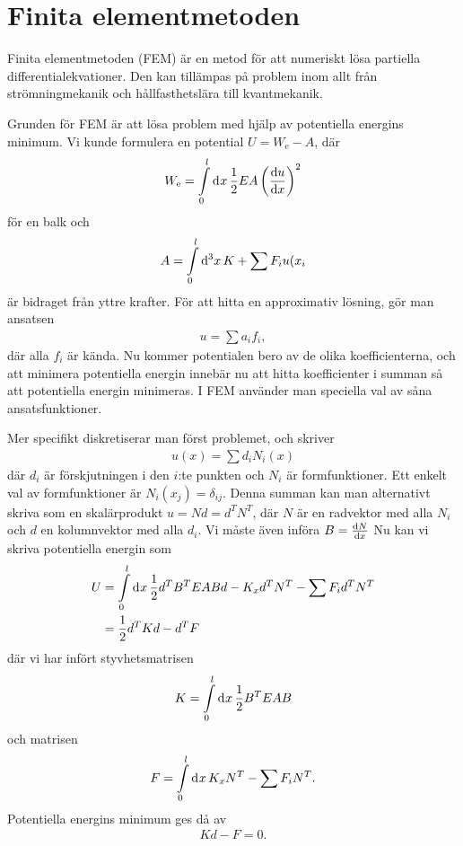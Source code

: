 \section{Finita elementmetoden}

Finita elementmetoden (FEM) är en metod för att numeriskt lösa partiella differentialekvationer. Den kan tillämpas på problem inom allt från strömningmekanik och hållfasthetslära till kvantmekanik.

Grunden för FEM är att lösa problem med hjälp av potentiella energins minimum. Vi kunde formulera en potential $U = W_{\text{e}} - A$, där
\begin{align*}
	W_{\text{e}} = \integ{0}{l}{x}{\frac{1}{2}EA\left(\dv{u}{x}\right)^{2}}
\end{align*}
för en balk och
\begin{align*}
	A = \integ[3]{0}{l}{x}{K} + \sum F_{i}u(x_{i}
\end{align*}
är bidraget från yttre krafter. För att hitta en approximativ lösning, gör man ansatsen
\begin{align*}
	u = \sum a_{i}f_{i},
\end{align*}
där alla $f_{i}$ är kända. Nu kommer potentialen bero av de olika koefficienterna, och att minimera potentiella energin innebär nu att hitta koefficienter i summan så att potentiella energin minimeras. I FEM använder man speciella val av såna ansatsfunktioner.

Mer specifikt diskretiserar man först problemet, och skriver
\begin{align*}
	u(x) = \sum d_{i}N_{i}(x)
\end{align*}
där $d_{i}$ är förskjutningen i den $i$:te punkten och $N_{i}$ är formfunktioner. Ett enkelt val av formfunktioner är $N_{i}(x_{j}) = \delta_{ij}$. Denna summan kan man alternativt skriva som en skalärprodukt $u = Nd = d^{T}N^{T}$, där $N$ är en radvektor med alla $N_{i}$ och $d$ en kolumnvektor med alla $d_{i}$. Vi måste även införa $B = \dv{N}{x}$ Nu kan vi skriva potentiella energin som
\begin{align*}
	U &= \integ{0}{l}{x}{\frac{1}{2}d^{T}B^{T}EABd - K_{x}d^{T}N^{T}} - \sum F_{i}d^{T}N^{T} \\
	  &= \frac{1}{2}d^{T}Kd - d^{T}F
\end{align*}
där vi har infört styvhetsmatrisen
\begin{align*}
	K = \integ{0}{l}{x}{\frac{1}{2}B^{T}EAB}
\end{align*}
och matrisen
\begin{align*}
	F = \integ{0}{l}{x}{K_{x}N^{T}} - \sum F_{i}N^{T}.
\end{align*}
Potentiella energins minimum ges då av
\begin{align*}
	Kd - F = 0.
\end{align*}